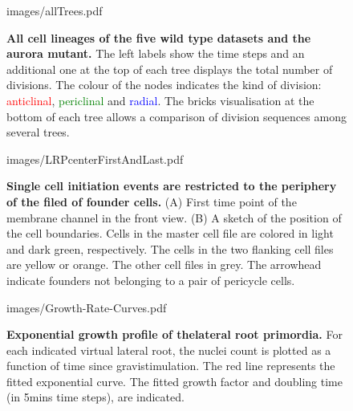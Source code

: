 \documentclass[11pt,a4paper, draft]{article}
\begin{document}
\clearpage
%
%
\begin{figure}
	\begin{center}
		\begin{overpic}[width=1.\linewidth]{images/allTrees.pdf}
		\end{overpic}
\caption[All cell lineages of the five wild type datasets and the aurora mutant.]
{
{\bf All cell lineages of the five wild type datasets and the aurora mutant.} The left labels show the time steps and an additional one at the top of each tree displays the total number of divisions. The colour of the nodes indicates the kind of division: \textcolor{red}{anticlinal}, \textcolor{green}{periclinal} and \textcolor{blue}{radial}. The bricks visualisation at the bottom of each tree allows a comparison of division sequences among several trees.
}
	\label{fig:allTrees}
	\end{center}
\end{figure}
\clearpage
%
\begin{figure}[htbp]
	\begin{center}
	\begin{overpic}[width=0.5\linewidth]{images/LRPcenterFirstAndLast.pdf}
	\end{overpic}
\caption[Single cell initiation events are restricted to the periphery of the filed of founder cells.]
{{\bf Single cell initiation events are restricted to the periphery of the filed of founder cells.} (A) First time point of the membrane channel in the front view. (B) A sketch of the position of the cell boundaries. Cells in the master cell file are colored in light and dark green, respectively. The cells in the two flanking cell files are yellow or orange. The other cell files in grey. The arrowhead indicate founders not belonging to a pair of pericycle cells.}
	\label{fig:founderstop}
	\end{center}
\end{figure}
%
\clearpage
%
%
\begin{figure}[htbp]
	\begin{center}
	\begin{overpic}[width=1.\linewidth]{images/Growth-Rate-Curves.pdf}
	\end{overpic}
\caption[Exponential growth profile of the lateral root primordia.]
{{\bf Exponential growth profile of thelateral root primordia.} For each indicated virtual lateral root, the nuclei count  is plotted as a function of time since gravistimulation. The red line represents the fitted exponential curve. The fitted growth factor and doubling time (in 5mins time steps), are indicated.}
	\label{fig:growthcurves}
	\end{center}
\end{figure}
\end{document}
